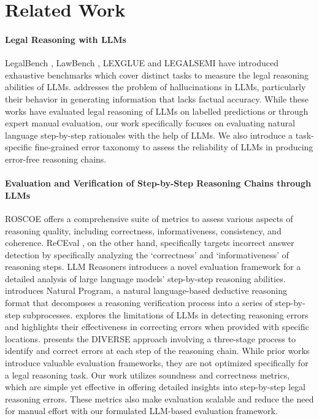 \section{Related Work}
\label{sec:related_work}
\paragraph{Legal Reasoning with LLMs}
LegalBench \citep{guha2023legalbench}, LawBench \citep{fei2023lawbench}, LEXGLUE \citep{chalkidis2021lexglue} and LEGALSEMI \citep{kang2024bridging} have introduced exhaustive benchmarks which cover distinct tasks to measure the legal reasoning abilities of LLMs. \citet{dahl2024large} addresses the problem of hallucinations in LLMs, particularly their behavior in generating information that lacks factual accuracy. While these works have evaluated legal reasoning of LLMs on labelled predictions or through expert manual evaluation, our work specifically focuses on evaluating natural language step-by-step rationales with the help of LLMs. We also introduce a task-specific fine-grained error taxonomy to assess the reliability of LLMs in producing error-free reasoning chains.

\paragraph{Evaluation and Verification of Step-by-Step Reasoning Chains through LLMs}
ROSCOE \citep{golovneva2023roscoesuitemetricsscoring} offers a comprehensive suite of metrics to assess various aspects of reasoning quality, including correctness, informativeness, consistency, and coherence. ReCEval \citep{prasad2023recevalevaluatingreasoningchains}, on the other hand, specifically targets incorrect answer detection by specifically analyzing the `correctness' and `informativeness' of reasoning steps. LLM Reasoners \citep{hao2024llmreasonersnewevaluation} introduces a novel evaluation framework for a detailed analysis of large language models’ step-by-step reasoning abilities. \citet{ling2023deductiveverificationchainofthoughtreasoning} introduces Natural Program, a natural language-based deductive reasoning format that decomposes a reasoning verification process into a series of step-by-step subprocesses. \citet{tyen2024llmsreasoningerrorscorrect} explores the limitations of LLMs in detecting reasoning errors and highlights their effectiveness in correcting errors when provided with specific locations. \citet{li2023making} presents the DIVERSE approach involving a three-stage process to identify and correct errors at each step of the reasoning chain. While prior works \citep{patel2024multi, tyagi2024stepbystepreasoningsolvegrid} introduce valuable evaluation frameworks, they are not optimized specifically for a legal reasoning task. Our work utilizes soundness and correctness metrics, which are simple yet effective in offering detailed insights into step-by-step legal reasoning errors. These metrics also make evaluation scalable and reduce the need for manual effort with our formulated LLM-based evaluation framework. 

